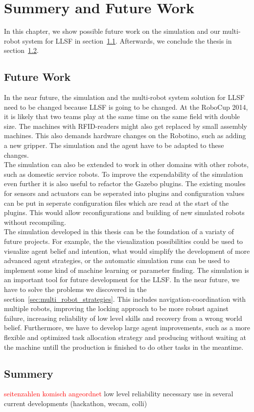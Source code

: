 \chapter{Summery and Future Work}
\label{cha:summery_and_future_work}
In this chapter, we show possible future work on the simulation and our multi-robot system for LLSF in section~\ref{sec:future_work}. Afterwards, we conclude the thesis in section~\ref{sec:summery}.

\section{Future Work}
\label{sec:future_work}
In the near future, the simulation and the multi-robot system solution for LLSF need to be changed because LLSF is going to be changed. At the RoboCup 2014, it is likely that two teams play at the same time on the same field with double size. The machines with RFID-readers might also get replaced by small assembly machines. This also demands hardware changes on the Robotino, such as adding a new gripper. The simulation and the agent have to be adapted to these changes.\\
The simulation can also be extended to work in other domains with other robots, such as domestic service robots. To improve the expendability of the simulation even further it is also useful to refactor the Gazebo plugins. The existing moules for sensors and actuators can be seperated into plugins and configuration values can be put in seperate configuration files which are read at the start of the plugins. This would allow reconfigurations and building of new simulated robots without recompiling.\\
The simulation developed in this thesis can be the foundation of a variaty of future projects. For example, the the visualization possibilities could be used to visualize agent belief and intention, what would simplify the development of more advanced agent strategies, or the automatic simulation runs can be used to implement some kind of machine learning or parameter finding. The simulation is an important tool for future development for the LLSF. In the near future, we have to solve the problems we discovered in the section~\ref{sec:multi_robot_strategies}. This includes navigation-coordination with multiple robots, improving the locking approach to be more robust against failure, increasing reliability of low level skills and recovery from a wrong world belief. Furthermore, we have to develop large agent improvements, such as a more flexible and optimized task allocation strategy and producing without waiting at the machine untill the production is finished to do other tasks in the meantime.

\section{Summery}
\label{sec:summery}

\textcolor{red}{seitenzahlen komisch angeordnet}
low level reliability necessary
use in several current developments (hackathon, wecam, colli)
